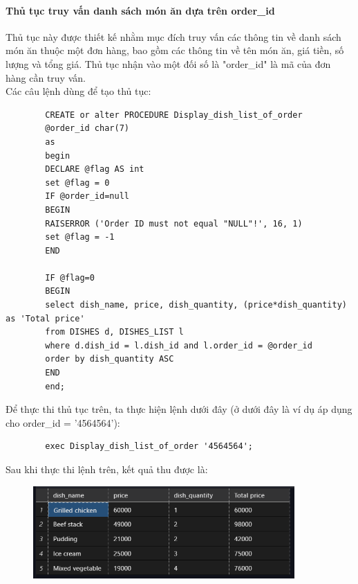 \documentclass[13pt,a4paper]{article}
\begin{document}
	\paragraph{Thủ tục truy vấn danh sách món ăn dựa trên order\_id\\}
	Thủ tục này được thiết kế nhằm mục đích truy vấn các thông tin về danh sách món ăn thuộc một đơn hàng, bao gồm các thông tin về tên món ăn, giá tiền, số lượng và tổng giá. Thủ tục nhận vào một đối số là "order\_id" là mã của đơn hàng cần truy vấn. \\
	Các câu lệnh dùng để tạo thủ tục:
	\begin{lstlisting}
		CREATE or alter PROCEDURE Display_dish_list_of_order
		@order_id char(7)
		as
		begin
		DECLARE @flag AS int
		set @flag = 0
		IF @order_id=null 
		BEGIN
		RAISERROR ('Order ID must not equal "NULL"!', 16, 1)
		set @flag = -1
		END
		
		IF @flag=0
		BEGIN
		select dish_name, price, dish_quantity, (price*dish_quantity) as 'Total price'
		from DISHES d, DISHES_LIST l
		where d.dish_id = l.dish_id and l.order_id = @order_id
		order by dish_quantity ASC
		END
		end;
	\end{lstlisting}
	Để thực thi thủ tục trên, ta thực hiện lệnh dưới đây (ở dưới đây là ví dụ áp dụng cho order\_id = '4564564'):
	\begin{lstlisting}
		exec Display_dish_list_of_order '4564564'; 
	\end{lstlisting}
	Sau khi thực thi lệnh trên, kết quả thu được là:
	\begin{figure}[h!]
		\begin{center}
			\includegraphics[width=10cm]{vitran/p_dl_d.png}
		\end{center}
	\end{figure}
	
\end{document}
